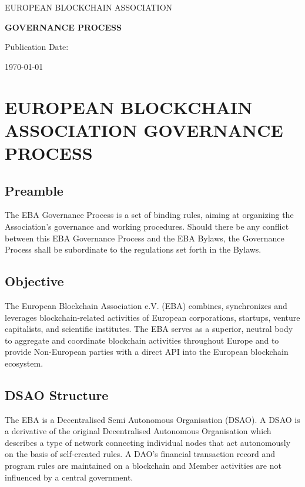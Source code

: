 \documentclass{article}
\begin{document}
\begin{titlepage}

	\vfill
	
	\centering
	{\scshape\LARGE EUROPEAN BLOCKCHAIN ASSOCIATION \par}
	\vspace{1cm}
	{\huge\bfseries GOVERNANCE PROCESS \par}
	\vspace{2cm}
	
	\vfill
	Publication Date:\par
	\today

	\vfill
	
\end{titlepage}

\tableofcontents
\newpage

\section{EUROPEAN BLOCKCHAIN ASSOCIATION GOVERNANCE PROCESS}

\subsection{Preamble}

The EBA Governance Process is a set of binding rules, aiming at organizing the Association's governance and working procedures. 
Should there be any conflict between this EBA Governance Process and the EBA Bylaws, the Governance Process shall be subordinate to the regulations set forth in the Bylaws.

\subsection{Objective}

The European Blockchain Association e.V. (EBA) combines, synchronizes and leverages blockchain-related activities of European corporations, startups, venture capitalists, and scientific institutes. 
The EBA serves as a superior, neutral body to aggregate and coordinate blockchain activities throughout Europe and to provide Non-European parties with a direct API into the European blockchain ecosystem.

\subsection{DSAO Structure}

The EBA is a Decentralised Semi Autonomous Organisation (DSAO). 
A DSAO is a derivative of the original Decentralised Autonomous Organisation which describes a type of network connecting individual nodes that act autonomously on the basis of self-created rules. 
A DAO's financial transaction record and program rules are maintained on a blockchain and Member activities are not influenced by a central government.
\end{document}
